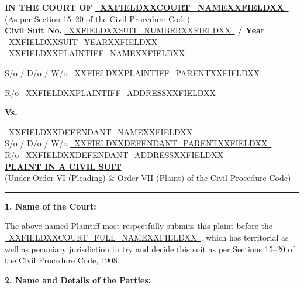 \documentclass[12pt, a4paper]{article}
\newcommand{\fillline}[1]{\underline{~#1~}}
\begin{document}
\begin{center}
    {\large \textbf{IN THE COURT OF \fillline{XXFIELDXXCOURT_NAMEXXFIELDXX}}} \\[4pt]
    {\normalsize (As per Section 15--20 of the Civil Procedure Code)} \\[12pt]
    {\normalsize \textbf{Civil Suit No.} \fillline{XXFIELDXXSUIT_NUMBERXXFIELDXX} \textbf{/ Year} \fillline{XXFIELDXXSUIT_YEARXXFIELDXX}} \\[14pt]

    \fillline{XXFIELDXXPLAINTIFF_NAMEXXFIELDXX}

    S/o / D/o / W/o \fillline{XXFIELDXXPLAINTIFF_PARENTXXFIELDXX}

    R/o \fillline{XXFIELDXXPLAINTIFF_ADDRESSXXFIELDXX}

    \vspace{4pt}
    \textbf{Vs.}
    \vspace{4pt}

    \fillline{XXFIELDXXDEFENDANT_NAMEXXFIELDXX} \\
    S/o / D/o / W/o \fillline{XXFIELDXXDEFENDANT_PARENTXXFIELDXX} \\
    R/o \fillline{XXFIELDXXDEFENDANT_ADDRESSXXFIELDXX} \\[4pt]

    \vspace{14pt}
    {\large \textbf{\uline{PLAINT IN A CIVIL SUIT}}} \\[4pt]
    {\small (Under Order VI (Pleading) \& Order VII (Plaint) of the Civil Procedure Code)}
\end{center}

\vspace{10pt}
\noindent\rule{\textwidth}{0.4pt}
\vspace{4pt}

\noindent \textbf{1. Name of the Court:}

\noindent The above-named Plaintiff most respectfully submits this plaint before the \fillline{XXFIELDXXCOURT_FULL_NAMEXXFIELDXX}, which has territorial as well as pecuniary jurisdiction to try and decide this suit as per Sections 15--20 of the Civil Procedure Code, 1908.

\vspace{8pt}
\noindent \textbf{2. Name and Details of the Parties:}
\end{document}
